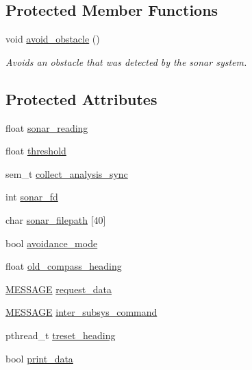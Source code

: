 \subsection*{Protected Member Functions}
\begin{DoxyCompactItemize}
\item 
void \hyperlink{classSonar_a2aa24ef4c9041e0db87db2eab602346d}{avoid\-\_\-obstacle} ()
\begin{DoxyCompactList}\small\item\em Avoids an obstacle that was detected by the sonar system. \end{DoxyCompactList}\end{DoxyCompactItemize}
\subsection*{Protected Attributes}
\begin{DoxyCompactItemize}
\item 
float \hyperlink{classSonar_abd3f8ccfc42cacd700df9be06f70c6b2}{sonar\-\_\-reading}
\item 
float \hyperlink{classSonar_a9896ea663ac5b8c327fed879fdc6110f}{threshold}
\item 
sem\-\_\-t \hyperlink{classSonar_a3dcf7c38af34539c68f123f073eb2f52}{collect\-\_\-analysis\-\_\-sync}
\item 
int \hyperlink{classSonar_a4799c8b328d7735f7e6d62d741340c6c}{sonar\-\_\-fd}
\item 
char \hyperlink{classSonar_a7db9106da9a50d06b5f25c35f799abe5}{sonar\-\_\-filepath} \mbox{[}40\mbox{]}
\item 
bool \hyperlink{classSonar_a72b11a8e569125119750ee9dd094141b}{avoidance\-\_\-mode}
\item 
float \hyperlink{classSonar_a223e1294a7e00208efcd2a80f57e7620}{old\-\_\-compass\-\_\-heading}
\item 
\hyperlink{SUBSYS__COMMANDS_8h_ad814416fc1a8c675bea2687d96088a8f}{M\-E\-S\-S\-A\-G\-E} \hyperlink{classSonar_a464358d71b06ae53bd477a7b629bd16e}{request\-\_\-data}
\item 
\hyperlink{SUBSYS__COMMANDS_8h_ad814416fc1a8c675bea2687d96088a8f}{M\-E\-S\-S\-A\-G\-E} \hyperlink{classSonar_a27d83a5a5c4859adb65641683e964018}{inter\-\_\-subsys\-\_\-command}
\item 
pthread\-\_\-t \hyperlink{classSonar_af3ec5683614e9f1755e54da32184412a}{treset\-\_\-heading}
\item 
bool \hyperlink{classSonar_ac9ab4c77456aea18ac1eb886a5c81f4c}{print\-\_\-data}
\end{DoxyCompactItemize}
